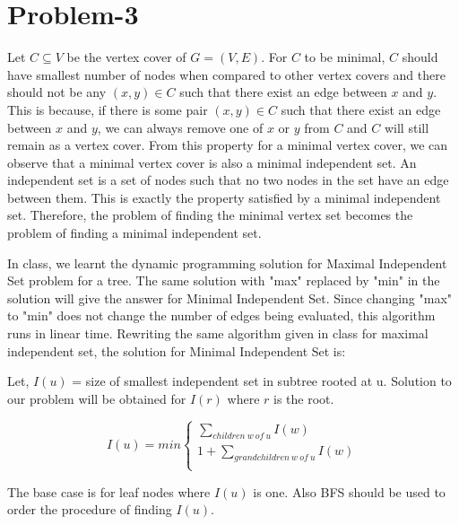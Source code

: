 \documentclass{article}
\begin{document}
\section{Problem-3}
Let $C\subseteq V$ be the vertex cover of $G=(V,E)$. For $C$ to be minimal, $C$ should have smallest number of nodes when compared to other vertex covers and there should not be any $(x,y) \in C$ such that there exist an edge between $x$ and $y$. This is because, if there is some pair $(x,y) \in C$ such that there exist an edge between $x$ and $y$, we can always remove one of $x$ or $y$ from $C$ and $C$ will still remain as a vertex cover. From this property for a minimal vertex cover, we can observe that a minimal vertex cover is also a minimal independent set. An independent set is a set of nodes such that no two nodes in the set have an edge between them. This is exactly the property satisfied by a minimal independent set. Therefore, the problem of finding the minimal vertex set becomes the problem of finding a minimal independent set. 

In class, we learnt the dynamic programming solution for Maximal Independent Set problem for a tree. The same solution with "max" replaced by "min" in the solution will give the answer for Minimal Independent Set. Since changing "max" to "min" does not change the number of edges being evaluated, this algorithm runs in linear time. Rewriting the same algorithm given in class for maximal independent set, the solution for Minimal Independent Set is:

Let, $I(u)$ = size of smallest independent set in subtree rooted at u. Solution to our problem will be obtained for $I(r)$ where $r$ is the root.

\[
  I(u) = min \left\{ 
  \begin{array}{l}
	  \sum_{children\ w\ of\ u} I(w) \\
	  1 + \sum_{grandchildren\ w\ of\ u} I(w) \\
  \end{array} \right.
\]

The base case is for leaf nodes where $I(u)$ is one. Also BFS should be used to order the procedure of finding $I(u)$.
\end{document}

